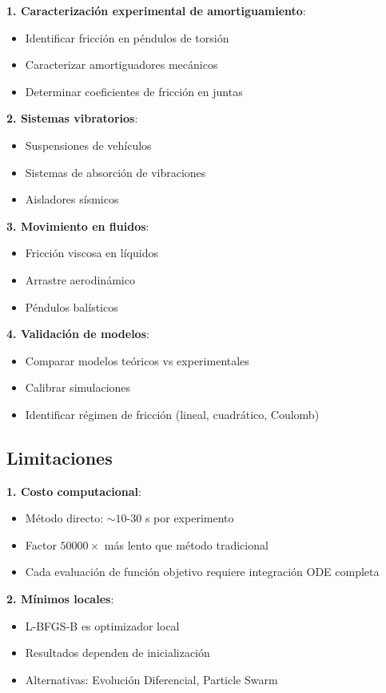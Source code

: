 \documentclass[11pt,a4paper]{article}
\begin{document}
\textbf{1. Caracterización experimental de amortiguamiento}:
\begin{itemize}
\item Identificar fricción en péndulos de torsión
\item Caracterizar amortiguadores mecánicos
\item Determinar coeficientes de fricción en juntas
\end{itemize}

\textbf{2. Sistemas vibratorios}:
\begin{itemize}
\item Suspensiones de vehículos
\item Sistemas de absorción de vibraciones
\item Aisladores sísmicos
\end{itemize}

\textbf{3. Movimiento en fluidos}:
\begin{itemize}
\item Fricción viscosa en líquidos
\item Arrastre aerodinámico
\item Péndulos balísticos
\end{itemize}

\textbf{4. Validación de modelos}:
\begin{itemize}
\item Comparar modelos teóricos vs experimentales
\item Calibrar simulaciones
\item Identificar régimen de fricción (lineal, cuadrático, Coulomb)
\end{itemize}

\subsection{Limitaciones}

\textbf{1. Costo computacional}:
\begin{itemize}
\item Método directo: $\sim 10$-$30$ s por experimento
\item Factor $50000\times$ más lento que método tradicional
\item Cada evaluación de función objetivo requiere integración ODE completa
\end{itemize}

\textbf{2. Mínimos locales}:
\begin{itemize}
\item L-BFGS-B es optimizador local
\item Resultados dependen de inicialización
\item Alternativas: Evolución Diferencial, Particle Swarm
\end{itemize}
\end{document}
